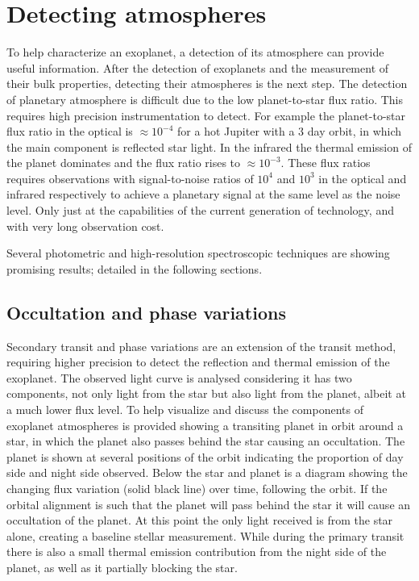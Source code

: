 
\section{Detecting atmospheres}
To help characterize an exoplanet, a detection of its atmosphere can provide useful information. After the detection of exoplanets and the measurement of their bulk properties, detecting their atmospheres is the next step. The detection of planetary atmosphere is difficult due to the low planet-to-star flux ratio. This requires high precision instrumentation to detect. For example the planet-to-star flux ratio in the optical is $\approx 10^{-4}$ for a hot Jupiter with a 3 day orbit, in which the main component is reflected star light. In the infrared the thermal emission of the planet dominates and the flux ratio rises to $\approx 10^{-3}$. These flux ratios requires observations with signal-to-noise ratios of $10^4$ and $10^3$ in the optical and infrared respectively to achieve a planetary signal at the same level as the noise level. Only just at the capabilities of the current generation of technology, and with very long observation cost.

Several photometric and high-resolution spectroscopic techniques are showing promising results; detailed in the following sections.


\subsection{Occultation and phase variations}
Secondary transit and phase variations are an extension of the transit method, requiring higher precision to detect the reflection and thermal emission of the exoplanet. The observed light curve is analysed considering it has two components, not only light from the star but also light from the planet, albeit at a much lower flux level.
To help visualize and discuss the components of exoplanet atmospheres  is provided showing a transiting planet in orbit around a star, in which the planet also passes behind the star causing an occultation. The planet is shown at several positions of the orbit indicating the proportion of day side and night side observed. Below the star and planet is a diagram showing the changing flux variation (solid black line) over time, following the orbit. If the orbital alignment is such that the planet will pass behind the star it will cause an occultation of the planet. At this point the only light received is from the star alone, creating a baseline stellar measurement. While during the primary transit there is also a small thermal emission contribution from the night side of the planet, as well as it partially blocking the star.

